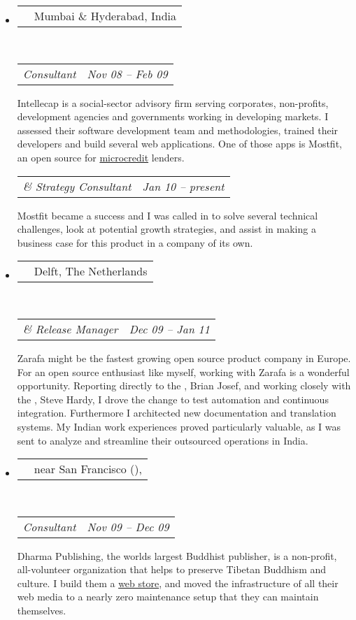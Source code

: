 \documentclass[10pt,a4paper]{article}
\makeatletter
\newcommand*\acr[1]{\textscale{.85}{#1}}
\newcommand{\headerrow}[2]
{\begin{tabular*}{\linewidth}{l@{\extracolsep{\fill}}r}
  \textscale{1.08}{\textbf{#1}} &
  {#2} \\
\end{tabular*}}
\newcommand{\subheaderrow}[2]
{\begin{tabular*}{\linewidth}{l@{\extracolsep{\fill}}r}
  \emph{#1} &
  \emph{#2} \\
\end{tabular*}}
\newcommand{\apo}{\raisebox{-.18ex}{'}{\hspace{-.1em}}}
\makeatother
\begin{document}
\begin{itemize} \parskip=0.1em

  \item  %
  \headerrow
    {\href{http://www.intellecap.com}{Intellecap}}
    {\sc Mumbai \& Hyderabad, India}
  \\
  \subheaderrow
    {\acr{IT} Consultant}
    {Nov \apo08 -- Feb \apo09}
  {Intellecap is a social-sector advisory firm serving corporates, non-profits, development agencies and governments working in developing markets. I assessed their software development team and methodologies, trained their developers and build several web applications. One of those apps is Mostfit, an open source \acr{MIS} for \href{http://en.wikipedia.org/wiki/Microcredit}{microcredit} lenders.
  \vspace{0.2em}}
  \\
  \subheaderrow
    {\acr{IT} \& Strategy Consultant}
    {Jan \apo10 -- present}
  Mostfit became a success and I was called in to solve several technical challenges, look at potential growth strategies, and assist in making a business case for this product in a company of its own.

  \item  %
  \headerrow
    {\href{http://www.zarafa.com}{Zarafa}}
    {\sc Delft, The Netherlands}
  \\
  \subheaderrow
    {\acr{QA} \& Release Manager}
    {Dec \apo09 -- Jan \apo11}
  Zarafa might be the fastest growing open source product company in Europe. For an open source enthusiast like myself, working with Zarafa is a wonderful opportunity. Reporting directly to the \acr{CEO}, Brian Josef, and working closely with the \acr{CTO}, Steve Hardy, I drove the change to test automation and continuous integration. Furthermore I architected new documentation and translation systems. My Indian work experiences proved particularly valuable, as I was sent to analyze and streamline their outsourced operations in India.

  \item  %
  \headerrow
    {\href{http://www.dharmapublishing.com}{Dharma Publishing}}
    {\sc near San Francisco (\acr{CA}), \acr{USA}}
  \\
  \subheaderrow
    {\acr{IT} Consultant}
    {Nov \apo09 -- Dec \apo09}
  Dharma Publishing, the worlds largest Buddhist publisher, is a non-profit, all-volunteer organization that helps to preserve Tibetan Buddhism and culture. I build them a \href{http://www.dharmapublishing.com}{web store}, and moved the infrastructure of all their web media to a nearly zero maintenance setup that they can maintain themselves.


\end{itemize}
\end{document}
